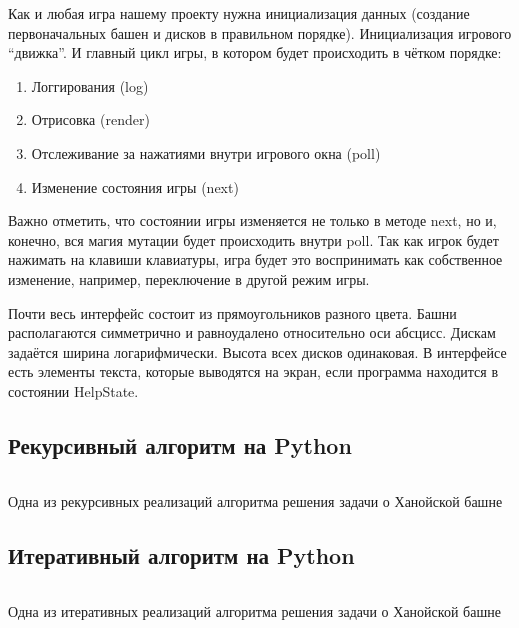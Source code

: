 Как и любая игра нашему проекту нужна инициализация данных (создание
первоначальных башен и дисков в правильном порядке). Инициализация игрового
``движка''. И главный цикл игры, в котором будет происходить в чётком порядке:

\begin{enumerate}
	\item Логгирования (log)
	\item Отрисовка (render)
	\item Отслеживание за нажатиями внутри игрового окна (poll)
	\item Изменение состояния игры (next)
\end{enumerate}

Важно отметить, что состоянии игры изменяется не только в методе next, но и,
конечно, вся магия мутации будет происходить внутри poll. Так как игрок будет
нажимать на клавиши клавиатуры, игра будет это воспринимать как собственное
изменение, например, переключение в другой режим игры.

Почти весь интерфейс состоит из прямоугольников разного цвета. Башни
располагаются симметрично и равноудалено относительно оси абсцисс. Дискам
задаётся ширина логарифмически. Высота всех дисков одинаковая. В интерфейсе
есть элементы текста, которые выводятся на экран, если программа находится в
состоянии HelpState.

\subsection{Рекурсивный алгоритм на Python}

\begin{code}
	\inputminted[breaklines=true, xleftmargin=1em, linenos, frame=single,
		framesep=10pt, fontsize=\footnotesize, firstline=119,
		lastline=137]{python}{../src/src/gamestate.py}
	\caption{Одна из рекурсивных реализаций алгоритма решения задачи о Ханойской
		башне}
\end{code}


\subsection{Итеративный алгоритм на Python}

\begin{code}
	\inputminted[breaklines=true, xleftmargin=1em, linenos, frame=single,
		framesep=10pt, fontsize=\footnotesize, firstline=139,
		lastline=168]{python}{../src/src/gamestate.py}
	\caption{Одна из итеративных реализаций алгоритма решения задачи о Ханойской
		башне}
\end{code}

